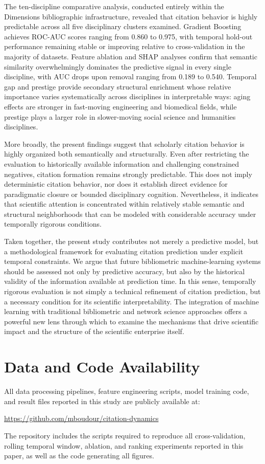 \documentclass[11pt,a4paper]{article}
\begin{document}
The ten-discipline comparative analysis, conducted entirely within the Dimensions bibliographic infrastructure, revealed that citation behavior is highly predictable across all five disciplinary clusters examined. Gradient Boosting achieves ROC-AUC scores ranging from 0.860 to 0.975, with temporal hold-out performance remaining stable or improving relative to cross-validation in the majority of datasets. Feature ablation and SHAP analyses confirm that semantic similarity overwhelmingly dominates the predictive signal in every single discipline, with AUC drops upon removal ranging from 0.189 to 0.540. Temporal gap and prestige provide secondary structural enrichment whose relative importance varies systematically across disciplines in interpretable ways: aging effects are stronger in fast-moving engineering and biomedical fields, while prestige plays a larger role in slower-moving social science and humanities disciplines.

More broadly, the present findings suggest that scholarly citation behavior is highly organized both semantically and structurally. Even after restricting the evaluation to historically available information and challenging constrained negatives, citation formation remains strongly predictable. This does not imply deterministic citation behavior, nor does it establish direct evidence for paradigmatic closure or bounded disciplinary cognition. Nevertheless, it indicates that scientific attention is concentrated within relatively stable semantic and structural neighborhoods that can be modeled with considerable accuracy under temporally rigorous conditions.

Taken together, the present study contributes not merely a predictive model, but a methodological framework for evaluating citation prediction under explicit temporal constraints. We argue that future bibliometric machine-learning systems should be assessed not only by predictive accuracy, but also by the historical validity of the information available at prediction time. In this sense, temporally rigorous evaluation is not simply a technical refinement of citation prediction, but a necessary condition for its scientific interpretability. The integration of machine learning with traditional bibliometric and network science approaches offers a powerful new lens through which to examine the mechanisms that drive scientific impact and the structure of the scientific enterprise itself.

\section*{Data and Code Availability}
All data processing pipelines, feature engineering scripts, model training
code, and result files reported in this study are publicly available at:
\begin{center}
\url{https://github.com/mboudour/citation-dynamics}
\end{center}
The repository includes the scripts required to reproduce all
cross-validation, rolling temporal window, ablation, and ranking
experiments reported in this paper, as well as the code generating
all figures.



\end{document}

